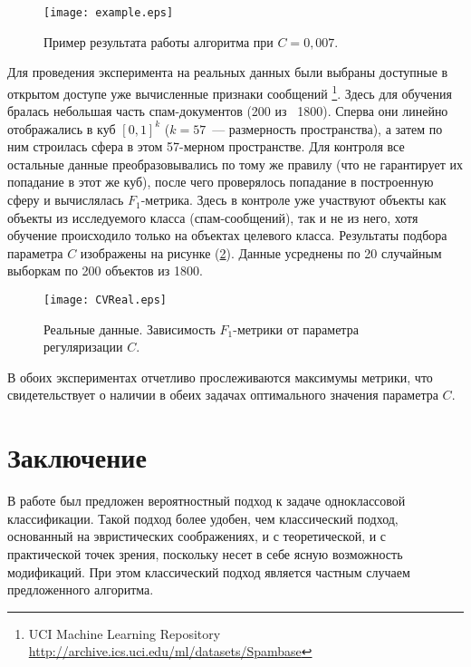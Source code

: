 ﻿\documentclass[12pt,a4paper]{amsart}
\begin{document}
	\begin{figure}[!ht] %
		\centering
		\texttt{[image: example.eps]} 
		\vspace{-5pt}
		\caption{Пример результата работы алгоритма при $C = 0{,}007.$}
		\label{eps:example}
	\end{figure}

	Для проведения эксперимента на реальных данных были выбраны доступные в открытом доступе уже вычисленные признаки сообщений \footnote{UCI Machine Learning Repository \href{http://archive.ics.uci.edu/ml/datasets/Spambase}{http://archive.ics.uci.edu/ml/datasets/Spambase}}. 
	Здесь для обучения бралась небольшая часть спам-документов (200 из ~1800). 
	Сперва они линейно отображались в куб $[0, 1]^k$ ($k = 57$~--- размерность пространства), а затем по ним строилась сфера в этом 57-мерном пространстве. 
	Для контроля все остальные данные преобразовывались по тому же правилу (что не гарантирует их попадание в этот же куб), после чего проверялось попадание в построенную сферу и вычислялась $F_1$-метрика. 
	Здесь в контроле уже участвуют объекты как объекты из исследуемого класса (спам-сообщений), так и не из него, хотя обучение происходило только на объектах целевого класса. 
	Результаты подбора параметра $C$ изображены на рисунке (\ref{eps:CVReal}). Данные усреднены по 20 случайным выборкам по 200 объектов из 1800.

	\begin{figure}[!ht] %
		\centering
		\texttt{[image: CVReal.eps]} %
		\vspace{-5pt}
		\caption{Реальные данные. Зависимость $F_1$-метрики от параметра регуляризации $C.$}
		\label{eps:CVReal}
	\end{figure}

	В обоих экспериментах отчетливо прослеживаются максимумы метрики, что свидетельствует о наличии в обеих задачах оптимального значения параметра $C.$


\section{Заключение}						
	В работе был предложен вероятностный подход к задаче одноклассовой классификации. Такой подход более удобен, чем классический подход, основанный на эвристических соображениях, и с теоретической, и с практической точек зрения, поскольку несет в себе ясную возможность модификаций. При этом классический подход является частным случаем предложенного алгоритма.
\end{document}
